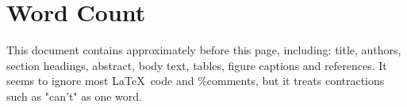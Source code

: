 

\newpage





\newpage

\section*{Word Count}

This document contains approximately {\large \textbf{\wordcount}} before this page, including: title, authors, section headings, abstract, body text, tables, figure captions and references. It seems to ignore most \LaTeX \ code and \%comments, but it treats contractions such as "can't" as one word.


